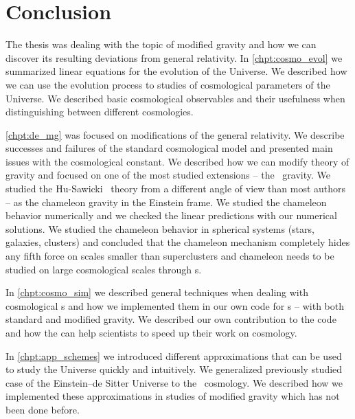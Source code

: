 \chapter*{Conclusion}


The thesis was dealing with the topic of modified gravity and how we can discover its resulting deviations from general relativity. In \autoref{chpt:cosmo_evol} we summarized linear equations for the evolution of the Universe. We described how we can use the evolution process to studies of cosmological parameters of the Universe. We described basic cosmological observables and their usefulness when distinguishing between different cosmologies.

\autoref{chpt:de_mg} was focused on modifications of the general relativity. We describe successes and failures of the standard cosmological model and presented main issues with the cosmological constant. We described how we can modify theory of gravity and focused on one of the most studied extensions -- the \fR\ gravity. We studied the Hu-Sawicki \fR\ theory from a different angle of view than most authors -- as the chameleon gravity in the Einstein frame. We studied the chameleon behavior numerically and we checked the linear predictions with our numerical solutions. We studied the chameleon behavior in spherical systems (stars, galaxies, clusters) and concluded that the chameleon mechanism completely hides any fifth force on scales smaller than superclusters and chameleon needs to be studied on large cosmological scales through \nbodysim s. 

In \autoref{chpt:cosmo_sim} we described general techniques when dealing with cosmological \nbodysim s and how we implemented them in our own code for \nbodysim s -- with both standard and modified gravity. We described our own contribution to the  code and how the  can help scientists to speed up their work on cosmology.

In \autoref{chpt:app_schemes} we introduced different approximations that can be used to study the Universe quickly and intuitively. We generalized previously studied case of the Einstein--de Sitter Universe to the \LCDM\ cosmology. We described how we implemented these approximations in studies of modified gravity which has not been done before.

